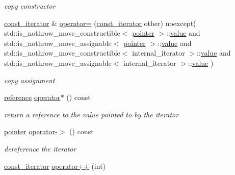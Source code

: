 \begin{DoxyCompactItemize}
\begin{DoxyCompactList}\small\item\em copy constructor \end{DoxyCompactList}\item 
\hyperlink{a00038}{const\+\_\+iterator} \& \hyperlink{a00038_a5521515067b6597cb0b55a9c547a7a2b}{operator=} (\hyperlink{a00038}{const\+\_\+iterator} other) noexcept(                                       std\+::is\+\_\+nothrow\+\_\+move\+\_\+constructible$<$ \hyperlink{a00038_a1da96fc3054d547e7706d3a2f073f389}{pointer} $>$\+::\hyperlink{a00038_ac75e80d30b6169ee2a29ec93fb4d2acd}{value} and                                       std\+::is\+\_\+nothrow\+\_\+move\+\_\+assignable$<$ \hyperlink{a00038_a1da96fc3054d547e7706d3a2f073f389}{pointer} $>$\+::\hyperlink{a00038_ac75e80d30b6169ee2a29ec93fb4d2acd}{value} and                                       std\+::is\+\_\+nothrow\+\_\+move\+\_\+constructible$<$ internal\+\_\+iterator $>$\+::\hyperlink{a00038_ac75e80d30b6169ee2a29ec93fb4d2acd}{value} and                                       std\+::is\+\_\+nothrow\+\_\+move\+\_\+assignable$<$ internal\+\_\+iterator $>$\+::\hyperlink{a00038_ac75e80d30b6169ee2a29ec93fb4d2acd}{value}                       )\hypertarget{a00038_a5521515067b6597cb0b55a9c547a7a2b}{}\label{a00038_a5521515067b6597cb0b55a9c547a7a2b}

\begin{DoxyCompactList}\small\item\em copy assignment \end{DoxyCompactList}\item 
\hyperlink{a00038_aefd248cac6493eed1e6ff53ba6a63eb2}{reference} \hyperlink{a00038_ab3029a1a83cf46dc28ad443bbad0c74d}{operator$\ast$} () const \hypertarget{a00038_ab3029a1a83cf46dc28ad443bbad0c74d}{}\label{a00038_ab3029a1a83cf46dc28ad443bbad0c74d}

\begin{DoxyCompactList}\small\item\em return a reference to the value pointed to by the iterator \end{DoxyCompactList}\item 
\hyperlink{a00038_a1da96fc3054d547e7706d3a2f073f389}{pointer} \hyperlink{a00038_a8be837e4d902887676dd837abe9098d3}{operator-\/$>$} () const \hypertarget{a00038_a8be837e4d902887676dd837abe9098d3}{}\label{a00038_a8be837e4d902887676dd837abe9098d3}

\begin{DoxyCompactList}\small\item\em dereference the iterator \end{DoxyCompactList}\item 
\hyperlink{a00038}{const\+\_\+iterator} \hyperlink{a00038_a8dbaec5bf8ccba3225520356629061cb}{operator++} (int)\hypertarget{a00038_a8dbaec5bf8ccba3225520356629061cb}{}\label{a00038_a8dbaec5bf8ccba3225520356629061cb}


\end{DoxyCompactItemize}
